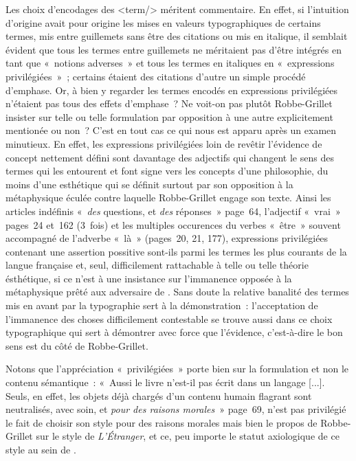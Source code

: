 \documentclass[12pt, a4paper]{article}
\begin{document}
Les choix d'encodages des <term/> méritent commentaire. En effet, si l'intuition d'origine avait pour origine les mises en valeurs typographiques de certains termes, mis entre guillemets sans être des citations ou mis en italique, il semblait évident que tous les termes entre guillemets ne méritaient pas d'être intégrés en tant que «~notions adverses~» et tous les termes en italiques en «~expressions privilégiées~»~; certains étaient des citations d'autre un simple procédé d'emphase. Or, à bien y regarder les termes encodés en expressions privilégiées n'étaient pas tous des effets d'emphase~? Ne voit-on pas plutôt Robbe-Grillet insister sur telle ou telle formulation par opposition à une autre explicitement mentionée ou non~? C'est en tout cas ce qui nous est apparu après un examen minutieux. En effet, les expressions privilégiées loin de revêtir l'évidence de concept nettement défini sont davantage des adjectifs qui changent le sens des termes qui les entourent et font signe vers les concepts d'une philosophie, du moins d'une esthétique qui se définit surtout par son opposition à la métaphysique éculée contre laquelle Robbe-Grillet engage son texte. Ainsi les articles indéfinis «~\textit{des} questions, et \textit{des} réponses~» page~64, l'adjectif «~vrai~» pages~24 et~162 (3~fois) et les multiples occurences du verbes «~être~» souvent accompagné de l'adverbe «~là~» (pages~20, 21, 177), expressions privilégiées contenant une assertion possitive sont-ils parmi les termes les plus courants de la langue française et, seul, difficilement rattachable à telle ou telle théorie ésthétique, si ce n'est à une insistance sur l'immanence opposée à la métaphysique prêté aux adversaire de \robbe{}. Sans doute la relative banalité des termes mis en avant par la typographie sert à la démonstration~: l'acceptation de l'immanence des choses difficilement contestable se trouve aussi dans ce choix typographique qui sert à démontrer avec force que l'évidence, c'est-à-dire le bon sens est du côté de Robbe-Grillet.



Notons que l'appréciation «~privilégiées~» porte bien sur la formulation et non le contenu sémantique~: «~Aussi le livre n’est-il pas écrit dans un langage [...]. Seuls, en effet, les objets déjà chargés d’un contenu humain flagrant sont neutralisés, avec soin, et \textit{pour des raisons morales}~» page~69, n'est pas privilégié le fait de choisir son style pour des raisons morales mais bien le propos de Robbe-Grillet sur le style de \textit{L'Étranger}, et ce, peu importe le statut axiologique de ce style au sein de \punr{}.
\end{document}
